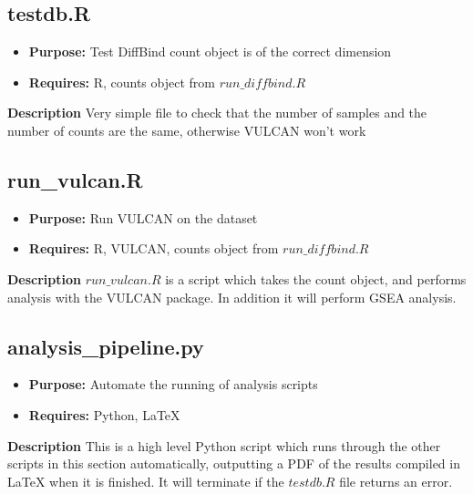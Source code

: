 \documentclass{amsart}
\begin{document}
\subsection{testdb.R}

    \begin{itemize}
        \item \textbf{Purpose: } Test DiffBind count object is of the correct dimension    
        \item \textbf{Requires: } R, counts object from $run\_diffbind.R$
    \end{itemize}
    \textbf{Description}
    Very simple file to check that the number of samples and the number of counts are the same, otherwise VULCAN won't work

\subsection{run\_vulcan.R}

    \begin{itemize}
        \item \textbf{Purpose: } Run VULCAN on the dataset
        \item \textbf{Requires: } R, VULCAN, counts object from $run\_diffbind.R$
    \end{itemize}
    \textbf{Description}
    $run\_vulcan.R$ is a script which takes the count object, and performs analysis with the VULCAN package. In addition it will perform GSEA analysis.

\subsection{analysis\_pipeline.py}
    
    \begin{itemize}
        \item \textbf{Purpose: } Automate the running of analysis scripts
        \item \textbf{Requires: } Python, LaTeX
    \end{itemize}
    \textbf{Description}
    This is a high level Python script which runs through the other scripts in this section automatically, outputting a PDF of the results compiled in LaTeX when it is finished. It will terminate if the $testdb.R$ file returns an error.
\end{document}
